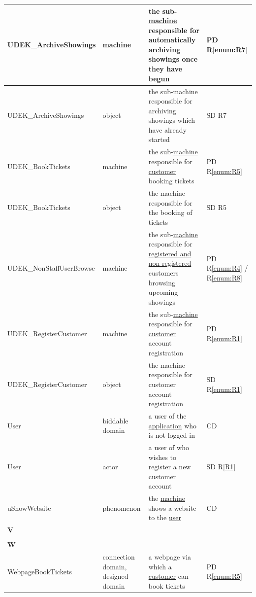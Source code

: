 \documentclass[a4paper,10pt,titlepage,bibtotoc,bibtotocnumbered]{scrreprt}
\begin{document}
\begin{longtable}{|l|p{3cm}|p{5cm}|l|}
\hline
\hypertarget{glossary:UDEK-ArchiveShowings}{UDEK\_ArchiveShowings} & machine & the sub-\hyperlink{glossary:UDEKino}{machine} responsible for automatically archiving showings once they have begun & PD R\ref{enum:R7} \\
\hline
UDEK\_ArchiveShowings & object & the sub-machine responsible for archiving showings which have already started & SD R7\\
\hline
\hypertarget{glossary:UDEK-BookTickets}{UDEK\_BookTickets} & machine & the sub-\hyperlink{glossary:UDEKino}{machine} responsible for \hyperlink{glossary:Customer}{customer} booking tickets & PD R\ref{enum:R5}\\
\hline
UDEK\_BookTickets & object & the machine responsible for the booking of tickets & SD R5\\
\hline
\hypertarget{glossary:UDEK-NonStaffUserBrowse}{UDEK\_NonStaffUserBrowse} & machine & the sub-\hyperlink{glossary:UDEKino}{machine} responsible for \hyperlink{glossary:NonStaffUser}{registered and non-registered} customers browsing upcoming showings & PD R\ref{enum:R4} / R\ref{enum:R8}\\
\hline
\hypertarget{glossary:UDEK-RegisterCustomer}{UDEK\_RegisterCustomer} & machine & the sub-\hyperlink{glossary:UDEKino}{machine} responsible for \hyperlink{glossary:Customer}{customer} account registration & PD R\ref{enum:R1}\\
\hline
UDEK\_RegisterCustomer & object & the machine responsible for customer account registration & SD R\ref{enum:R1}\\
\hline
\hypertarget{glossary:User}{User} & biddable domain & a user of the \hyperlink{glossary:UDEKino}{application} who is not logged in & CD\\
\hline
User & actor & a user of who wishes to register a new customer account & SD R\ref{R1}\\
\hline
\hypertarget{glossary:uShowWebsite}{uShowWebsite} & phenomenon & the \hyperlink{glossary:UDEKino}{machine} shows a website to the \hyperlink{glossary:User}{user} & CD\\
\hline
\multicolumn{4}{|l|}{\textbf{V}}\\
\hline
&  &  & \\
\hline
\multicolumn{4}{|l|}{\textbf{W}}\\
\hline
\hypertarget{glossary:WebpageBookTickets}{WebpageBookTickets} & connection domain, designed domain & a webpage via which a \hyperlink{glossary:Customer}{customer} can book tickets & PD R\ref{enum:R5}\\

\end{longtable}
\end{document}
